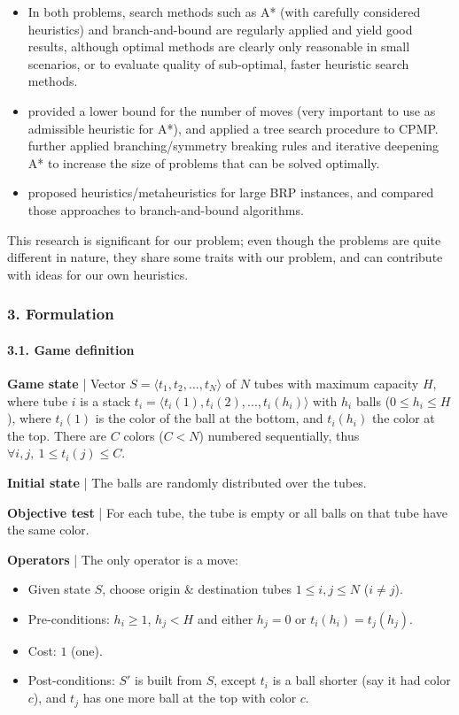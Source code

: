 \documentclass{beamer}
\begin{document}
\begin{frame}
\begin{itemize}
\item In both problems, search methods such as A* (with carefully considered heuristics) and branch-and-bound are regularly applied and yield good results, although optimal methods are clearly only reasonable in small scenarios, or to evaluate quality of sub-optimal, faster heuristic search methods.

\item \cite{bortfeldt2012} provided a lower bound for the number of moves (very important to use as admissible heuristic for A*), and applied a tree search procedure to CPMP. \cite{tierney2017} further applied branching/symmetry breaking rules and iterative deepening A* to increase the size of problems that can be solved optimally.

\item \cite{tricoire2018} proposed heuristics/metaheuristics for large BRP instances, and compared those approaches to branch-and-bound algorithms.
\end{itemize}

This research is significant for our problem; even though the problems are quite different in nature, they share some traits with our problem, and can contribute with ideas for our own heuristics.

\end{frame}

\begin{frame}[fragile=singleslide]
\frametitle{3. Formulation}
\framesubtitle{3.1. Game definition}

\textbf{Game state} | Vector $S = \langle t_1, t_2, ..., t_N \rangle$ of $N$ tubes with maximum capacity $H$, where tube $i$ is a stack $t_i = \langle t_i(1), t_i(2), ..., t_i(h_i) \rangle$ with $h_i$ balls ($0 \leq h_i \leq H$), where $t_i(1)$ is the color of the ball at the bottom, and $t_i(h_i)$ the color at the top. There are $C$ colors ($C < N$) numbered sequentially, thus $\forall i, j,~1 \leq t_i(j) \leq C$.

\textbf{Initial state} | The balls are randomly distributed over the tubes.

\textbf{Objective test} | For each tube, the tube is empty or all balls on that tube have the same color.

\textbf{Operators} | The only operator is a move:
\begin{itemize}
  \item Given state $S$, choose origin \& destination tubes $1 \leq i, j \leq N$ ($i \neq j$).
  \item Pre-conditions: $h_i \geq 1$, $h_j < H$ and either $h_j = 0$ or $t_i(h_i)=t_j(h_j)$.
  \item Cost: $1$ (one).
  \item Post-conditions: $S'$ is built from $S$, except $t_i$ is a ball shorter (say it had color $c$), and $t_j$ has one more ball at the top with color $c$.
\end{itemize}

\end{frame}
\end{document}
